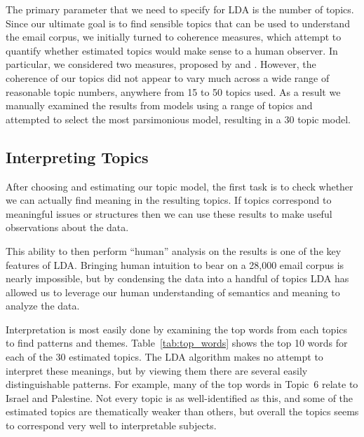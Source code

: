 \documentclass[12pt]{article}
\theoremstyle{definition}
\theoremstyle{algodesc}
\begin{document}
The primary parameter that we need to specify for LDA is the number of topics. Since our ultimate goal is to find sensible topics that can be used to understand the email corpus, we initially turned to coherence measures, which attempt to quantify whether estimated topics would make sense to a human observer. In particular, we considered two measures, proposed by \citet{mimnoetal11} and \citet{newmanetal11}. However, the coherence of our topics did not appear to vary much across a wide range of reasonable topic numbers, anywhere from 15 to 50 topics used. As a result we manually examined the results from models using a range of topics and attempted to select the most parsimonious model, resulting in a 30 topic model.



\subsection{Interpreting Topics}
After choosing and estimating our topic model, the first task is to check whether we can actually find meaning in the resulting topics. If topics correspond to meaningful issues or structures then we can use these results to make useful observations about the data.

This ability to then perform ``human'' analysis on the results is one of the key features of LDA. Bringing human intuition to bear on a 28,000 email corpus is nearly impossible, but by condensing the data into a handful of topics LDA has allowed us to leverage our human understanding of semantics and meaning to analyze the data.

Interpretation is most easily done by examining the top words from each topics to find patterns and themes. Table~\ref{tab:top_words} shows the top 10 words for each of the 30 estimated topics. The LDA algorithm makes no attempt to interpret these meanings, but by viewing them there are several easily distinguishable patterns. For example, many of the top words in Topic~6 relate to Israel and Palestine. Not every topic is as well-identified as this, and some of the estimated topics are thematically weaker than others, but overall the topics seems to correspond very well to interpretable subjects.
\end{document}
